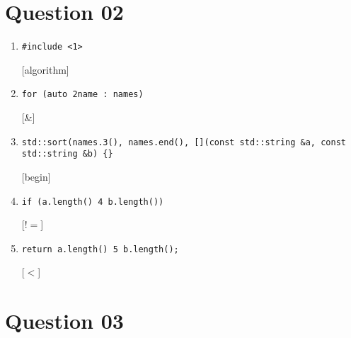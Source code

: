 \documentclass{article}
\begin{document}
\section{Question 02}
\begin{enumerate}[label=(\arabic*)]

\item \begin{verbatim}
#include <1>
\end{verbatim}

[algorithm]

\item \begin{verbatim} 
for (auto 2name : names)
\end{verbatim}

[\&]

\item \begin{verbatim} 
std::sort(names.3(), names.end(), [](const std::string &a, const std::string &b) {}
\end{verbatim}

[begin]

\item \begin{verbatim}
if (a.length() 4 b.length())
\end{verbatim}

[$!=$]

\item \begin{verbatim}
return a.length() 5 b.length();
\end{verbatim}

[$<$]

\end{enumerate}

\section{Question 03}
\end{document}
